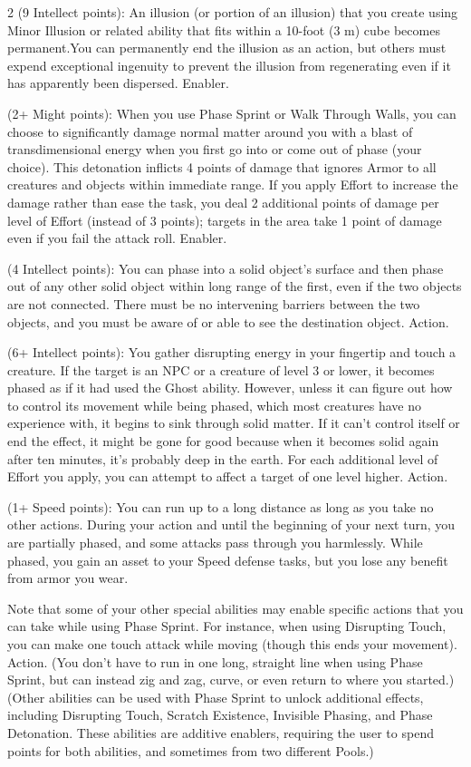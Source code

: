 \begin{multicols}{2}
 (9 Intellect points): An illusion (or portion of an illusion) that you create using Minor Illusion or related ability that fits within a 10-foot (3 m) cube becomes permanent.You can permanently end the illusion as an action, but others must expend exceptional ingenuity to prevent the illusion from regenerating even if it has apparently been dispersed. Enabler. 
 
 (2+ Might points): When you use Phase Sprint or Walk Through Walls, you can choose to significantly damage normal matter around you with a blast of transdimensional energy when you first go into or come out of phase (your choice). This detonation inflicts 4 points of damage that ignores Armor to all creatures and objects within immediate range. If you apply Effort to increase the damage rather than ease the task, you deal 2 additional points of damage per level of Effort (instead of 3 points); targets in the area take 1 point of damage even if you fail the attack roll. Enabler.
 
 (4 Intellect points): You can phase into a solid object’s surface and then phase out of any other solid object within long range of the first, even if the two objects are not connected. There must be no intervening barriers between the two objects, and you must be aware of or able to see the destination object. Action. 
 
 (6+ Intellect points): You gather disrupting energy in your fingertip and touch a creature. If the target is an NPC or a creature of level 3 or lower, it becomes phased as if it had used the Ghost ability. However, unless it can figure out how to control its movement while being phased, which most creatures have no experience with, it begins to sink through solid matter. If it can’t control itself or end the effect, it might be gone for good because when it becomes solid again after ten minutes, it’s probably deep in the earth. For each additional level of Effort you apply, you can attempt to affect a target of one level higher. Action. 
 
 (1+ Speed points): You can run up to a long distance as long as you take no other actions. During your action and until the beginning of your next turn, you are partially phased, and some attacks pass through you harmlessly. While phased, you gain an asset to your Speed defense tasks, but you lose any benefit from armor you wear. 

Note that some of your other special abilities may enable specific actions that you can take while using Phase Sprint. For instance, when using Disrupting Touch, you can make one touch attack while moving (though this ends your movement). Action. (You don’t have to run in one long, straight line when using Phase Sprint, but can instead zig and zag, curve, or even return to where you started.) (Other abilities can be used with Phase Sprint to unlock additional effects, including Disrupting Touch, Scratch Existence, Invisible Phasing, and Phase Detonation. These abilities are additive enablers, requiring the user to spend points for both abilities, and sometimes from two different Pools.)
 

\end{multicols}
